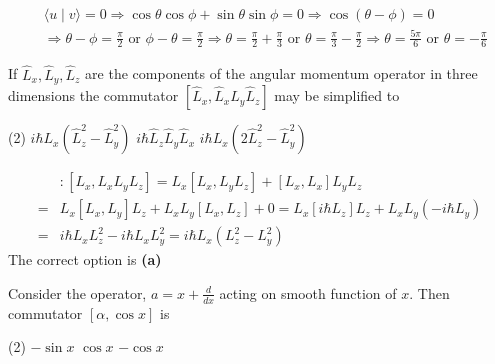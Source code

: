 \begin{enumerate}
\begin{answer}
\begin{align*}
		&\langle u \mid v\rangle=0 \Rightarrow \cos \theta \cos \phi+\sin \theta \sin \phi=0 \Rightarrow \cos (\theta-\phi)=0 \\
		&\Rightarrow \theta-\phi=\frac{\pi}{2} \text { or } \phi-\theta=\frac{\pi}{2} \Rightarrow \theta=\frac{\pi}{2}+\frac{\pi}{3} \text { or } \theta=\frac{\pi}{3}-\frac{\pi}{2} \Rightarrow \theta=\frac{5 \pi}{6} \text { or } \theta=-\frac{\pi}{6}
	\end{align*}
\end{answer}
\begin{minipage}{\textwidth}
	\item If $\hat{L}_{x}, \hat{L}_{y}, \hat{L}_{z}$ are the components of the angular momentum operator in three dimensions the commutator $\left[\hat{L}_{x}, \hat{L}_{x} \hat{L}_{y} \hat{L}_{z}\right]$ may be simplified to
\end{minipage}
\begin{tasks}(2)
	\task[\textbf{A.}] $i \hbar L_{x}\left(\hat{L}_{z}^{2}-\hat{L}_{y}^{2}\right)$
	\task[\textbf{B.}]$i \hbar \hat{L}_{z} \hat{L}_{y} \hat{L}_{x}$
	\task[\textbf{C.}]$i \hbar L_{x}\left(2 \hat{L}_{z}^{2}-\hat{L}_{y}^{2}\right)$
\end{tasks}
\begin{answer}
	\begin{align*}
		&:\left[L_{x}, L_{x} L_{y} L_{z}\right]=L_{x}\left[L_{x}, L_{y} L_{z}\right]+\left[L_{x}, L_{x}\right] L_{y} L_{z} \\
		=& L_{x}\left[L_{x}, L_{y}\right] L_{z}+L_{x} L_{y}\left[L_{x}, L_{z}\right]+0=L_{x}\left[i \hbar L_{z}\right] L_{z}+L_{x} L_{y}\left(-i \hbar L_{y}\right) \\
		=& i \hbar L_{x} L_{z}^{2}-i \hbar L_{x} L_{y}^{2}=i \hbar L_{x}\left(L_{z}^{2}-L_{y}^{2}\right)
	\end{align*}
	The correct option is \textbf{(a)}
\end{answer}
\begin{minipage}{\textwidth}
	\item Consider the operator, $a=x+\frac{d}{d x}$ acting on smooth function of $x$. Then commutator $[\alpha, \cos x]$ is
\end{minipage}
\begin{tasks}(2)
	\task[\textbf{A.}] $-\sin x$
	\task[\textbf{B.}]$\cos x$
	\task[\textbf{C.}]$-\cos x$
\end{tasks}
\begin{answer}
	

\end{answer}
\end{enumerate}
